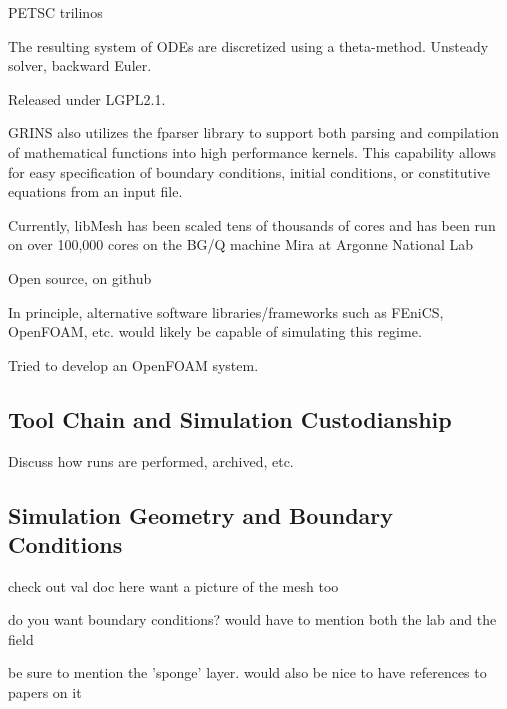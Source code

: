 PETSC\cite{petsc} trilinos\cite{trilinos}

The resulting system of ODEs are discretized using a theta-method. 
Unsteady solver, backward Euler. 

Released under LGPL2.1\cite{lgpl}. 

GRINS also utilizes the fparser\cite{fparser}
library to support both parsing and compilation of mathematical
functions into high 
performance kernels. This capability allows for easy specification of
boundary conditions, initial conditions, or constitutive equations from an input file. 

Currently, libMesh has been scaled tens of thousands of cores and has
been run on over 100,000 cores on the BG/Q machine Mira at Argonne National
Lab\cite{libmesh-scaling}

Open source, on github\cite{github}

In principle, alternative software libraries/frameworks such as
FEniCS\cite{fenics}, OpenFOAM\cite{openfoam}, etc. would likely be
capable of simulating this regime. 

Tried to develop an OpenFOAM system.   

\subsection{Tool Chain and Simulation Custodianship}

Discuss how runs are performed, archived, etc. 

\subsection{Simulation Geometry and Boundary Conditions}

check out val doc here
want a picture of the mesh too

do you want boundary conditions? would have to mention both the lab and
the field

be sure to mention the 'sponge' layer. would also be nice to have references to papers on it
